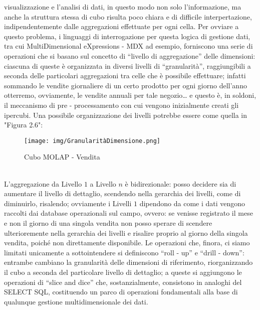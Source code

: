\documentclass[a4paper,12pt]{report}
\begin{document}
visualizzazione e l’analisi di dati, in questo modo non solo l’informazione, ma anche la struttura stessa di cubo risulta poco chiara e di difficile interpertazione, indipendentemente dalle aggregazioni effettuate per ogni cella. Per ovviare a questo problema, i linguaggi di interrogazione per questa logica di gestione dati, tra cui MultiDimensional eXpressions - MDX ad esempio, forniscono una serie di operazioni che si basano sul concetto di “livello di aggregazione” delle dimensioni: ciascuna di queste è organizzata in diversi livelli di “granularità”, raggiungibili a seconda delle particolari aggregazioni tra celle che è possibile effettuare; infatti sommando le vendite giornaliere di un certo prodotto per ogni giorno dell’anno otterremo, ovviamente, le vendite annuali per tale negozio… e questo è, in soldoni, il meccanismo di pre - processamento con cui vengono inizialmente creati gli ipercubi. Una possibile organizzazione dei livelli potrebbe essere come quella in "Figura 2.6":
\begin{figure}[ht]
    \centering
    \texttt{[image: img/GranularitàDimensione.png]}
    \caption{Cubo MOLAP - Vendita}
\end{figure}
\noindent
\\[0ex]
L’aggregazione da Livello $1$ a Livello $n$ è bidirezionale: posso decidere sia di aumentare il livello di dettaglio, scendendo nella gerarchia dei livelli, come di diminuirlo, risalendo; ovviamente i Livelli $1$ dipendono da come i dati vengono raccolti dai database operazionali sul campo, ovvero: se venisse registrato il mese e non il giorno di una singola vendita non posso sperare di scendere ulterioremente nella gerarchia dei livelli e risalire proprio al giorno della singola vendita, poiché non direttamente disponibile. 
Le operazioni che, finora, ci siamo limitati unicamente a sottointendere si definiscono “roll - up” e “drill - down”: entrambe cambiano la granularità delle dimensioni di riferimento, riorganizzando il cubo a seconda del particolare livello di dettaglio; a queste si aggiungono le operazioni di “slice and dice” che, sostanzialmente, consistono in analoghi del SELECT SQL, costituendo un parco di operazioni fondamentali alla base di qualunque gestione multidimensionale dei dati.
\end{document}
